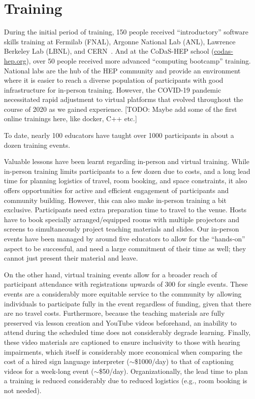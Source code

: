 \documentclass[twocolumn]{svjour3}          %
\begin{document}
\section{Training}\label{sec:Training}

During the initial period of training, 150 people received \enquote{introductory} software skills training at Fermilab (FNAL), Argonne National Lab (ANL), Lawrence Berkeley Lab (LBNL), and CERN~\cite{HSF-training-SC-FNAL-2019,HSF-training-ATLAS-ANL-2019,HSF-training-ATLAS-LBNL-2019,HSF-training-SC-CERN-2019}. And at the CoDaS-HEP school (\href{http://codas-hep.org/}{codas-hep.org}), over 50 people received more advanced ``computing bootcamp'' training. National labs are the hub of the HEP community and provide an environment where it is easier to reach a diverse population of participants with good infrastructure for in-person training.  However, the COVID-19 pandemic necessitated rapid adjustment to virtual platforms that evolved throughout the course of 2020 as we gained experience. [TODO: Maybe add some of the first online trainings here, like docker, C++ etc.] 

To date, nearly 100 educators have taught over 1000 participants in about a dozen training events. 

Valuable lessons have been learnt regarding in-person and virtual training. While in-person training limits participants to a few dozen due to costs, and a long lead time for planning logistics of travel, room booking, and space constraints, it also offers opportunities for active and efficient engagement of participants and community building. However, this can also make in-person training a bit exclusive. Participants need extra preparation time to travel to the venue. Hosts have to book specially arranged/equipped rooms with multiple projectors and screens to simultaneously project teaching materials and slides. Our in-person events have been managed by around five educators to allow for the ``hands-on'' aspect to be successful, and need a large commitment of their time as well; they cannot just present their material and leave.

On the other hand, virtual training events allow for a broader reach of participant attendance with registrations upwards of 300 for single events.  These events are a considerably more equitable service to the community by allowing individuals to participate fully in the event regardless of funding, given that there are no travel costs. Furthermore, because the teaching materials are fully preserved via lesson creation and YouTube videos beforehand, an inability to attend during the scheduled time does not considerably degrade learning.  Finally, these video materials are captioned to ensure inclusivity to those with hearing impairments, which itself is considerably more economical when comparing the cost of a hired sign language interpreter ($\sim$\$1000/day) to that of captioning videos for a week-long event ($\sim$\$50/day). Organizationally, the lead time to plan a training is reduced considerably due to reduced logistics (e.g., room booking is not needed).
\end{document}
